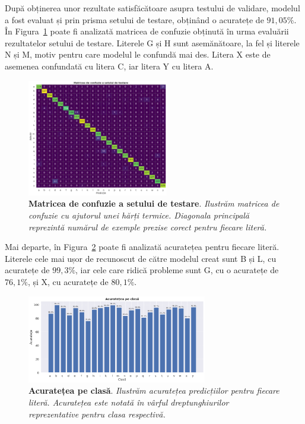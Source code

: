 După obținerea unor rezultate satisfăcătoare asupra testului de validare, modelul a fost evaluat și prin prisma setului de testare, obținând o acuratețe de $91,05\%$. În Figura~\ref{fig:conf_matrix_test_set} poate fi analizată matricea de confuzie obținută în urma evaluării rezultatelor setului de testare. Literele G și H sunt asemănătoare, la fel și literele N și M, motiv pentru care modelul le confundă mai des. Litera X este de asemenea confundată cu litera C, iar litera Y cu litera A.

\begin{figure}[H]
  \centering
  \includegraphics[width=0.55\textwidth]{images/2-recunoasterea-asl/conf_matrix_test_set.png}
  \caption[Matricea de confuzie a setului de testare]{\textbf{Matricea de confuzie a setului de testare}. \textit{Ilustrăm matricea de confuzie cu ajutorul unei hărți termice. Diagonala principală reprezintă numărul de exemple prezise corect pentru fiecare literă.}}
  \label{fig:conf_matrix_test_set}
\end{figure}

Mai departe, în Figura~\ref{fig:acc_per_class} poate fi analizată acuratețea pentru fiecare literă. Literele cele mai ușor de recunoscut de către modelul creat sunt B și L, cu acuratețe de $99,3\%$, iar cele care ridică probleme sunt G, cu o acuratețe de $76,1\%$, și X, cu acuratețe de $80,1\%$.

\begin{figure}[H]
  \centering
  \includegraphics[width=0.7\textwidth]{images/2-recunoasterea-asl/acc_per_class.png}
  \caption[Acuratețea pe clasă]{\textbf{Acuratețea pe clasă}. \textit{Ilustrăm acuratețea predicțiilor pentru fiecare literă. Acuratețea este notată în vârful dreptunghiurilor reprezentative pentru clasa respectivă.}}
  \label{fig:acc_per_class}
\end{figure}

